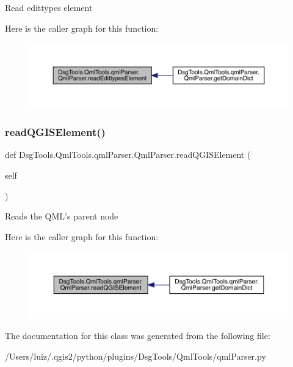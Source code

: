 \begin{DoxyVerb}Read edittypes element
\end{DoxyVerb}
 Here is the caller graph for this function\+:
\nopagebreak
\begin{figure}[H]
\begin{center}
\leavevmode
\includegraphics[width=350pt]{class_dsg_tools_1_1_qml_tools_1_1qml_parser_1_1_qml_parser_a711bc4f9cf1e4a41d115cf8d2713a2ee_icgraph}
\end{center}
\end{figure}
\mbox{\label{class_dsg_tools_1_1_qml_tools_1_1qml_parser_1_1_qml_parser_a500f38b0f41d855bc2679c6287ffff37}} 
\subsubsection{\texorpdfstring{read\+Q\+G\+I\+S\+Element()}{readQGISElement()}}
{\footnotesize\ttfamily def Dsg\+Tools.\+Qml\+Tools.\+qml\+Parser.\+Qml\+Parser.\+read\+Q\+G\+I\+S\+Element (\begin{DoxyParamCaption}\item[{}]{self }\end{DoxyParamCaption})}

\begin{DoxyVerb}Reads the QML's parent node
\end{DoxyVerb}
 Here is the caller graph for this function\+:
\nopagebreak
\begin{figure}[H]
\begin{center}
\leavevmode
\includegraphics[width=350pt]{class_dsg_tools_1_1_qml_tools_1_1qml_parser_1_1_qml_parser_a500f38b0f41d855bc2679c6287ffff37_icgraph}
\end{center}
\end{figure}


The documentation for this class was generated from the following file\+:\begin{DoxyCompactItemize}
\item 
/\+Users/luiz/.\+qgis2/python/plugins/\+Dsg\+Tools/\+Qml\+Tools/qml\+Parser.\+py\end{DoxyCompactItemize}
